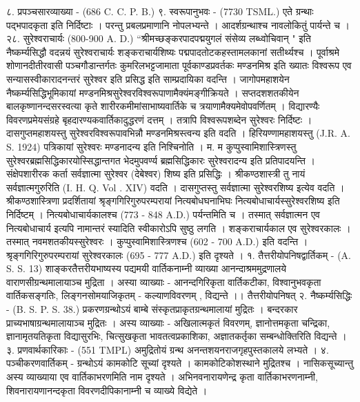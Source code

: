 ८. प्रपञ्चसारव्याख्या - (686 C. C. P. B.)
९. स्वरूपानुभवः - (7730 TSML.)
एते ग्रन्थाः पद्भपादकृता इति निर्दिष्टाः । परन्तु प्रबलप्रमाणानि नोपलभ्यन्ते । आदर्शग्रन्थाश्च नावलोकितुं पार्यन्ते च ।
२८. सुरेश्वराचार्यः (800-900 A. D.)
``श्रीमच्छङ्करपादपद्मयुगलं संसेव्य लब्ध्वोचिवान् " इति नैष्कर्म्यसिद्धौ वदन्नयं सुरेश्वराचार्यः शङ्कराचार्यशिष्यः पद्मपादतोटकहस्तामलकानां सतीर्थ्यश्च ।
पूर्वाश्रमे शोणानदीतीरवासी पञ्चगौडान्तर्गतः कुमरिलभट्टजामाता पूर्वकाण्डप्रवर्तकः मण्डनमिश्र इति ख्यातः विश्वरूप एव सन्यासस्वीकारादनन्तरं सुरेश्वर इति प्रसिद्ध इति साम्प्रदायिका वदन्ति । जागोपमहाशयेन नैष्कर्म्यसिद्धिभूमिकायां मण्डनमिश्रसुरेश्वरविश्वरूपाणामैक्यंमङ्गीक्रियते । सप्तदशशतकीयेन बालकृष्णानन्दसरस्वत्या कृते शारीरकमीमांसाभाष्यवार्तिके च त्रयाणामैक्यमेवोपवर्णितम् । विद्यारण्यैः विवरणप्रमेयसंग्रहे बृहदारण्यकवार्तिकादुद्धरणं दत्तम् । तत्रापि विश्वरूपशब्देन सुरेश्वरः निर्दिष्टः ।
दासगुप्तमहाशयस्तु सुरेश्वरविश्वरूपावभिन्नौ मण्डनमिश्रस्त्वन्य इति वदति । हिरियण्णामहाशयस्तु (J.R. A. S. 1924) पत्रिकायां सुरेश्वरः मण्डनादन्य इति निश्चिनोति । म. म कुप्पुस्वामिशास्त्रिणस्तु सुरेश्वरब्रह्मसिद्धिकारयोस्सिद्धान्तगत भेदमुपवर्ण्य ब्रह्मसिद्धिकारः सुरेश्वरादन्य इति प्रतिपादयन्ति । संक्षेपशारीरक कर्ता सर्वज्ञात्मा सुरेश्वर (देबेश्वर) शिष्य इति प्रसिद्धिः । श्रीकण्ठशास्त्री तु नायं सर्वज्ञात्मगुरुरिति (I. H. Q. Vol . XIV) वदति । दासगुप्तस्तु सर्वज्ञात्मा सुरेश्वरशिष्य इत्येव वदति । श्रीकण्ठशास्त्रिणा प्रदर्शितायां श्रृङ्गगिरिगुरुपरम्परायां नित्यबोधघनाभिघः नित्यबोधाचार्यस्सुरेश्वरशिष्य इति निर्दिष्टम् । नित्यबोधाचार्यकालश्च (773 - 848 A.D.) पर्यन्तमिति च । तस्मात् सर्वज्ञात्मन एव नित्यबोधाचार्य इत्यपि नामान्तरं स्यादिति स्वीकारोऽपि सुष्ठु लगति ।
शङ्कराचार्यकाल एव सुरेश्वरकालः । तस्मात् नवमशतकीयस्सुरेश्वरः । कुप्पुस्वामिशास्त्रिणश्च  (602 - 700 A.D.) इति वदन्ति । श्रृङ्गगिरिगुरुपरम्परायां सुरेश्वरकालः (695 - 777 A.D.) इति दृश्यते ।
१. तैत्तरीयोपनिषद्वार्तिकम् - (A. S. S. 13)
शाङ्करतैत्तरीयभाष्यस्य पद्यमयी वार्तिकनाम्नी व्याख्या आनन्दाश्रममुद्रणालये वाराणसीग्रन्थमालायाञ्च मुद्रिता । अस्या व्याख्याः - आनन्दगिरिकृता वार्तिकटीका, विश्वानुभवकृता वार्तिकसङ्गतिः, लिङ्गनसोमयाजिकृतम् - कल्याणविवरणम् , विद्यन्ते ।।
तैत्तरीयोपनिषत्
२. नैष्कर्म्यसिद्धिः - (B. S. P. S. 38.)
प्रकरणग्रन्थोऽयं बाम्बे संस्कृतप्राकृतग्रन्थमालायां मुद्रितः । बन्दरकार प्राच्यभाषाग्रन्थमालायाञ्च मुद्रितः । अस्य व्याख्याः - अखिलात्मकृतं विवरणम्, ज्ञानोत्तमकृता चन्द्रिका, ज्ञानामृतयतिकृता विद्यासुरभिः, चित्सुखकृता भावतत्वप्रकाशिका, अज्ञातकर्तृका सम्बन्धोक्तिरिति विद्यन्ते ।
३. प्रणवार्थकारिकाः - (551 TMPL)
अमुद्रितोयं ग्रन्थ अनन्तशयनराजगृहपुस्तकालये लभ्यते ।
४. पञ्चीकरणवार्तिकम् -
ग्रन्थोऽयं कामकोटि सूच्यां दृश्यते । कामकोटिकोशस्थाने मुद्रितश्च । नासिकसूच्यान्तु अस्य व्याख्याया एव वार्तिकाभरणमिति नाम दृश्यते । अभिनवनारायणेन्द्र कृता वार्तिकाभरणनाम्नी, शिवनारायणानन्दकृता विवरणदीपिकानाम्नी च व्याख्ये विद्येते ।

